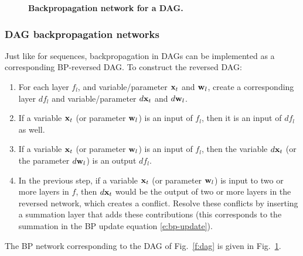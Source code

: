 \begin{figure}[H]
\begin{center}
	\end{center}
	\vspace{-1em}
	\caption{\textbf{Backpropagation network for a DAG.}}\label{f:dagbp}
\end{figure}

\subsubsection{DAG backpropagation networks}\label{s:bpnets-dag}

Just like for sequences, backpropagation in DAGs can be implemented as a corresponding BP-reversed DAG. To construct the reversed DAG:
\begin{enumerate}
	\item For each layer $f_l$, and variable/parameter $\mathbf{x}_t$ and $\mathbf{w}_l$, create a corresponding layer $df_l$ and variable/parameter $d\mathbf{x}_t$ and $d\mathbf{w}_l$.
	\item If a variable $\mathbf{x}_t$ (or parameter $\mathbf{w}_l$) is an input of $f_l$, then it is an input of $df_l$ as well.
	\item If a variable $\mathbf{x}_t$ (or parameter $\mathbf{w}_l$) is an input of $f_l$, then the variable $d\mathbf{x}_t$ (or the parameter $d\mathbf{w}_l$) is an output $df_l$.
	\item In the previous step, if a variable $\mathbf{x}_t$ (or parameter $\mathbf{w}_l$) is input to two or more layers in $f$, then $d\mathbf{x}_t$ would be the output of two or more layers in the reversed network, which creates a conflict. Resolve these conflicts by inserting a summation layer that adds these contributions (this corresponds to the summation in the BP update equation \eqref{e:bp-update}).
\end{enumerate}
The BP network corresponding to the DAG of Fig.~\ref{f:dag} is given in Fig.~\ref{f:dagbp}.


